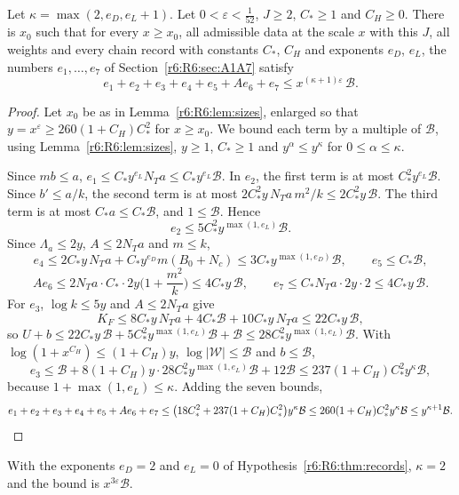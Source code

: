 \begin{proposition}\label{r6:R6:prop:errors}
Let $\kappa=\max(2,e_D,e_L+1)$. Let $0<\varepsilon<\frac1{52}$, $J\ge2$, $C_\ast\ge1$ and $C_H\ge0$. There is $x_0$ such that for every $x\ge x_0$, all admissible data at the scale $x$ with this $J$, all weights and every chain record with constants $C_\ast$, $C_H$ and exponents $e_D$, $e_L$, the numbers $e_1,\dots,e_7$ of Section~\ref{r6:R6:sec:A1A7} satisfy
\[
e_1+e_2+e_3+e_4+e_5+Ae_6+e_7\le x^{(\kappa+1)\varepsilon}\,\mathcal B .
\]
\end{proposition}

\begin{proof}
Let $x_0$ be as in Lemma~\ref{r6:R6:lem:sizes}, enlarged so that $y=x^\varepsilon\ge260(1+C_H)C_\ast^2$ for $x\ge x_0$. We bound each term by a multiple of $\mathcal B$, using Lemma~\ref{r6:R6:lem:sizes}, $y\ge1$, $C_\ast\ge1$ and $y^\alpha\le y^\kappa$ for $0\le\alpha\le\kappa$.

Since $mb\le a$, $e_1\le C_\ast y^{e_L}N_Ta\le C_\ast y^{e_L}\mathcal B$. In $e_2$, the first term is at most $C_\ast^2y^{e_L}\mathcal B$. Since $b'\le a/k$, the second term is at most $2C_\ast^2y\,N_Ta\,m^2/k\le2C_\ast^2y\,\mathcal B$. The third term is at most $C_\ast a\le C_\ast\mathcal B$, and $1\le\mathcal B$. Hence
\[
e_2\le5C_\ast^2y^{\max(1,e_L)}\mathcal B .
\]
Since $\Lambda_a\le2y$, $A\le2N_Ta$ and $m\le k$,
\[
e_4\le2C_\ast y\,N_Ta+C_\ast y^{e_D}m(B_0+N_c)\le3C_\ast y^{\max(1,e_D)}\mathcal B,\qquad e_5\le C_\ast\mathcal B,
\]
\[
Ae_6\le2N_Ta\cdot C_\ast\cdot2y\Big(1+\frac{m^2}k\Big)\le4C_\ast y\,\mathcal B,\qquad e_7\le C_\ast N_Ta\cdot2y\cdot2\le4C_\ast y\,\mathcal B .
\]
For $e_3$, $\log k\le5y$ and $A\le2N_Ta$ give
\[
K_F\le8C_\ast y\,N_Ta+4C_\ast\mathcal B+10C_\ast y\,N_Ta\le22C_\ast y\,\mathcal B,
\]
so $U+b\le22C_\ast y\,\mathcal B+5C_\ast^2y^{\max(1,e_L)}\mathcal B+\mathcal B\le28C_\ast^2y^{\max(1,e_L)}\mathcal B$. With $\log(1+x^{C_H})\le(1+C_H)y$, $\log\lvert\mathcal W\rvert\le\mathcal B$ and $b\le\mathcal B$,
\[
e_3\le\mathcal B+8(1+C_H)y\cdot28C_\ast^2y^{\max(1,e_L)}\mathcal B+12\mathcal B\le237(1+C_H)C_\ast^2y^{\kappa}\mathcal B,
\]
because $1+\max(1,e_L)\le\kappa$. Adding the seven bounds,
\[
e_1+e_2+e_3+e_4+e_5+Ae_6+e_7\le\big(18C_\ast^2+237(1+C_H)C_\ast^2\big)y^\kappa\mathcal B\le260(1+C_H)C_\ast^2y^\kappa\mathcal B\le y^{\kappa+1}\mathcal B .\qedhere
\]
\end{proof}

With the exponents $e_D=2$ and $e_L=0$ of Hypothesis~\ref{r6:R6:thm:records}, $\kappa=2$ and the bound is $x^{3\varepsilon}\mathcal B$.
